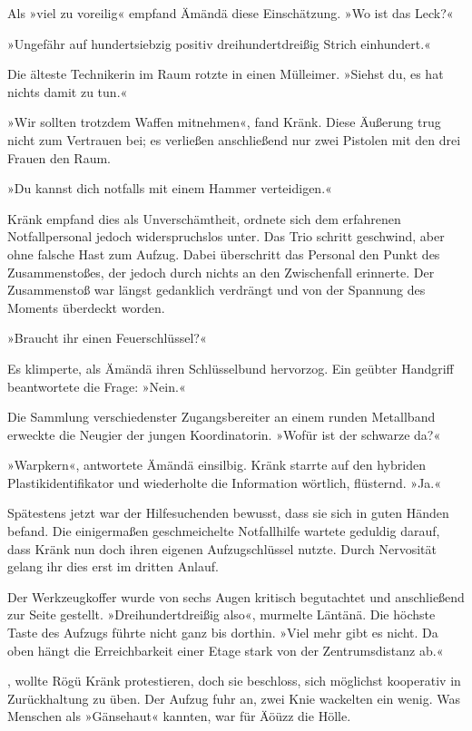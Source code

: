 Als »viel zu voreilig« empfand Ämändä diese Einschätzung. »Wo ist das Leck?«

»Ungefähr auf hundertsiebzig positiv dreihundertdreißig Strich einhundert.«

Die älteste Technikerin im Raum rotzte in einen Mülleimer. »Siehst du, es hat nichts damit zu tun.«

»Wir sollten trotzdem Waffen mitnehmen«, fand Kränk. Diese Äußerung trug nicht zum Vertrauen bei; es verließen anschließend nur zwei Pistolen mit den drei Frauen den Raum.

»Du kannst dich notfalls mit einem Hammer verteidigen.«

Kränk empfand dies als Unverschämtheit, ordnete sich dem erfahrenen Notfallpersonal jedoch widerspruchslos unter. Das Trio schritt geschwind, aber ohne falsche Hast zum Aufzug. Dabei überschritt das Personal den Punkt des Zusammenstoßes, der jedoch durch nichts an den Zwischenfall erinnerte. Der Zusammenstoß war längst gedanklich verdrängt und von der Spannung des Moments überdeckt worden.

»Braucht ihr einen Feuerschlüssel?«

Es klimperte, als Ämändä ihren Schlüsselbund hervorzog. Ein geübter Handgriff beantwortete die Frage: »Nein.«

Die Sammlung verschiedenster Zugangsbereiter an einem runden Metallband erweckte die Neugier der jungen Koordinatorin. »Wofür ist der schwarze da?«

»Warpkern«, antwortete Ämändä einsilbig. Kränk starrte auf den hybriden Plastikidentifikator und wiederholte die Information wörtlich, flüsternd. »Ja.«

Spätestens jetzt war der Hilfesuchenden bewusst, dass sie sich in guten Händen befand. Die einigermaßen geschmeichelte Notfallhilfe wartete geduldig darauf, dass Kränk nun doch ihren eigenen Aufzugschlüssel nutzte. Durch Nervosität gelang ihr dies erst im dritten Anlauf.

Der Werkzeugkoffer wurde von sechs Augen kritisch begutachtet und anschließend zur Seite gestellt. »Dreihundertdreißig also«, murmelte Läntänä. Die höchste Taste des Aufzugs führte nicht ganz bis dorthin. »Viel mehr gibt es nicht. Da oben hängt die Erreichbarkeit einer Etage stark von der Zentrumsdistanz ab.«

, wollte Rögü Kränk protestieren, doch sie beschloss, sich möglichst kooperativ in Zurückhaltung zu üben. Der Aufzug fuhr an, zwei Knie wackelten ein wenig. Was Menschen als »Gänsehaut« kannten, war für Äöüzz die Hölle.

